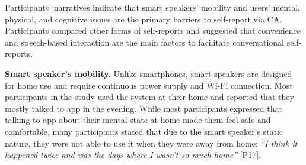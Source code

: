    Participants' narratives indicate that smart speakers' mobility and users' mental, physical, and cognitive issues are the primary barriers to self-report via CA.
    Participants compared other forms of self-reports and suggested that convenience and speech-based interaction are the main factors to facilitate conversational self-reports.

    
        
        
        \textbf{Smart speaker's mobility. }
        Unlike smartphones, smart speakers are designed for home use and require continuous power supply and Wi-Fi connection.
        Most participants in the study used the system at their home and reported that they mostly talked to \acl{app} in the evening. 
        While most participants expressed that talking to \acl{app} about their mental state at home made them feel safe and comfortable, 
        many participants stated that due to the smart speaker's static nature, they were not able to use it when they were away from home:
            \textit{``I think it happened twice and was the days where I wasn’t so much home''}
            [P17].
        
        
